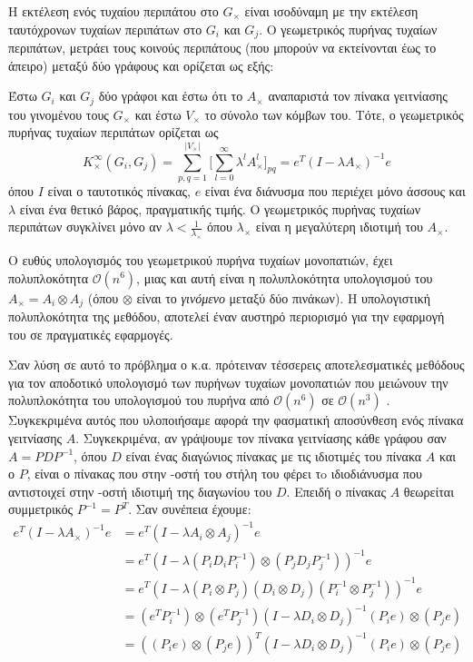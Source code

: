 Η εκτέλεση ενός τυχαίου περιπάτου στο $G_{\times}$ είναι ισοδύναμη με την εκτέλεση ταυτόχρονων τυχαίων περιπάτων στο $G_i$ και $G_j$.
Ο γεωμετρικός πυρήνας τυχαίων περιπάτων, μετράει τους κοινούς περιπάτους (που μπορούν να εκτείνονται έως το άπειρο) μεταξύ δύο γράφους και ορίζεται ως εξής:
\begin{definition}
	Έστω $G_i$ και $G_j$ δύο γράφοι και έστω ότι το $A_\times$ αναπαριστά τον πίνακα γειτνίασης του γινομένου τους $G_\times$ και έστω $V_\times$ το σύνολο των κόμβων του.
	Τότε, ο γεωμετρικός πυρήνας τυχαίων περιπάτων ορίζεται ως
	\begin{equation}
    	K_{\times}^{\infty}(G_i,G_j) = \sum_{p,q=1}^{|V_{\times}|} \Big[ \sum_{l=0}^{\infty} \lambda^l A_{\times}^l \Big]_{pq} = e^T(I - \lambda A_{\times})^{-1} e
    \end{equation}
	όπου $I$ είναι ο ταυτοτικός πίνακας, $e$ είναι ένα διάνυσμα που περιέχει μόνο άσσους και $\lambda$ είναι ένα θετικό βάρος, πραγματικής τιμής.
	Ο γεωμετρικός πυρήνας τυχαίων περιπάτων συγκλίνει μόνο αν  $\lambda < \frac{1}{\lambda_\times}$ όπου $\lambda_\times$ είναι η μεγαλύτερη ιδιοτιμή του $A_{\times}$.
\end{definition}
Ο ευθύς υπολογισμός του γεωμετρικού πυρήνα τυχαίων μονοπατιών, έχει πολυπλοκότητα $\mathcal{O}(n^6)$, μιας και αυτή είναι η πολυπλοκότητα υπολογισμού του $A_{\times}=A_{i}\otimes A_{j}$ (όπου $\otimes$ είναι το \textit{γινόμενο } μεταξύ δύο πινάκων).
Η υπολογιστική πολυπλοκότητα της μεθόδου, αποτελεί έναν αυστηρό περιορισμό για την εφαρμογή του σε πραγματικές εφαρμογές.\par
Σαν λύση σε αυτό το πρόβλημα ο  κ.α. πρότειναν τέσσερεις αποτελεσματικές μεθόδους για τον αποδοτικό υπολογισμό των πυρήνων τυχαίων μονοπατιών  που μειώνουν την πολυπλοκότητα του υπολογισμού του πυρήνα από $\mathcal{O}(n^6)$ σε $\mathcal{O}(n^3)$ \cite{vishwanathan2010graph}.
Συγκεκριμένα αυτός που υλοποιήσαμε αφορά την φασματική αποσύνθεση ενός πίνακα γειτνίασης $A$.
Συγκεκριμένα, αν γράψουμε τον πίνακα γειτνίασης κάθε γράφου σαν $A=P D P^{-1}$, όπου $D$ είναι ένας διαγώνιος πίνακας με τις ιδιοτιμές του πίνακα $Α$ και ο $P$, είναι ο πίνακας που στην -οστή του στήλη του φέρει τo ιδιοδιάνυσμα που αντιστοιχεί στην -οστή ιδιοτιμή της διαγωνίου του $D$.
Επειδή ο πίνακας $A$ θεωρείται συμμετρικός $P^{-1}=P^{T}$.
Σαν συνέπεια έχουμε:
\begin{equation}
\begin{aligned}
    e^T(I - \lambda A_{\times})^{-1} e & = e^T(I - \lambda A_{i}\otimes A_{j})^{-1} e \\ & = e^T(I - \lambda (P_{i} D_{i} P^{-1}_{i})\otimes (P_{j} D_{j} P^{-1}_{j}))^{-1} e \\
    & = e^T(I - \lambda (P_{i} \otimes P_{j}) (D_{i} \otimes D_{j}) (P^{-1}_{i} \otimes P^{-1}_{j}))^{-1} e \\
    &= (e^T P_{i}^{-1})\otimes (e^T P_{j}^{-1})(I - \lambda D_{i} \otimes D_{j})^{-1} (P_{i} e) \otimes (P_{j} e) \\
    &= ((P_{i} e) \otimes (P_{j} e))^{T} (I - \lambda D_{i} \otimes D_{j})^{-1} (P_{i} e) \otimes (P_{j} e)
\end{aligned}
\end{equation}
